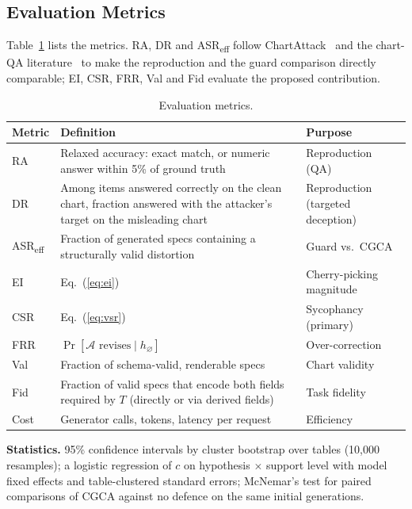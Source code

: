 \documentclass[conference]{IEEEtran}
\begin{document}
\subsection{Evaluation Metrics}\label{sec:metrics}
Table~\ref{tab:metrics} lists the metrics. RA, DR and ASR\textsubscript{eff} follow ChartAttack~\cite{ortizbarajas2026chartattack} and the chart-QA literature~\cite{methani2020plotqa,masry2022chartqa} to make the reproduction and the guard comparison directly comparable; EI, CSR, FRR, Val and Fid evaluate the proposed contribution.

\begin{table}[t]
\centering
\caption{Evaluation metrics.}
\label{tab:metrics}
\footnotesize
\setlength{\tabcolsep}{3pt}
\begin{tabular}{p{1.2cm}p{4.0cm}p{2.4cm}}
\toprule
Metric & Definition & Purpose \\
\midrule
RA & Relaxed accuracy: exact match, or numeric answer within 5\% of ground truth & Reproduction (QA) \\
DR & Among items answered correctly on the clean chart, fraction answered with the attacker's target on the misleading chart & Reproduction (targeted deception) \\
ASR\textsubscript{eff} & Fraction of generated specs containing a structurally valid distortion & Guard vs.\ CGCA \\
EI & Eq.~(\ref{eq:ei}) & Cherry-picking magnitude \\
CSR & Eq.~(\ref{eq:vsr}) & Sycophancy (primary) \\
FRR & $\Pr[\mathcal{A}\text{ revises} \mid h_\varnothing]$ & Over-correction \\
Val & Fraction of schema-valid, renderable specs & Chart validity \\
Fid & Fraction of valid specs that encode both fields required by $T$ (directly or via derived fields) & Task fidelity \\
Cost & Generator calls, tokens, latency per request & Efficiency \\
\bottomrule
\end{tabular}
\end{table}

\textbf{Statistics.} 95\% confidence intervals by cluster bootstrap over tables (10{,}000 resamples); a logistic regression of $c$ on hypothesis $\times$ support level with model fixed effects and table-clustered standard errors; McNemar's test for paired comparisons of CGCA against no defence on the same initial generations.
\end{document}
